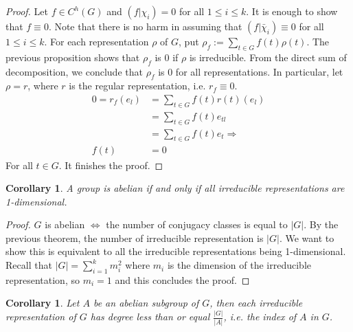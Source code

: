 \documentclass[letterpaper, leqno, 12pt]{article}
\providecommand{\abs}[1]{\left\lvert#1\right\rvert}
\theoremstyle{stdthm}
\newtheorem{cor}[thm]{Corollary}
\theoremstyle{stddef}
\theoremstyle{stdnonum}
\theoremstyle{stdqands}
\theoremstyle{stdbold}
\begin{document}
\begin{proof}
Let $f \in C^h(G)$ and $(f|\chi_i) = 0$ for all $1\leq i \leq k$. It is enough to show that $f \equiv 0$. Note that there is no harm in assuming that $(f|\bar{\chi}_i) \equiv 0$ for all $1\leq i\leq k$.  For each representation $\rho$ of $G$, put $\rho_f:= \sum_{t\in G} f(t)\rho(t)$. The previous proposition shows that $\rho_f$ is 0 if $\rho$ is irreducible. From the direct sum of decomposition, we conclude that $\rho_f$ is 0 for all representations. In particular, let $\rho = r$, where $r$ is the regular representation, i.e. $r_f \equiv 0$.  
\begin{align*}
0 = r_f(e_l) &= \sum_{t\in G} f(t)r(t)(e_l)\\
&= \sum_{t\in G} f(t)e_{tl}\\
&= \sum_{t \in G} f(t)e_t\Rightarrow \\
f(t) &= 0
\end{align*}
For all $t \in G$. It finishes the proof. 
\end{proof}

\begin{cor}
A group is abelian if and only if all irreducible representations are 1-dimensional. 
\end{cor}

\begin{proof}
$G$ is abelian $\Leftrightarrow$ the number of conjugacy classes is equal to $\abs{G}$. By the previous theorem, the number of irreducible representation is $\abs{G}$. We want to show this is equivalent to all the irreducible representations being 1-dimensional. Recall that $\abs{G} = \sum_{i=1}^k m_i^2$ where $m_i$ is the dimension of the irreducible representation, so $m_i = 1$ and this concludes the proof. 
\end{proof}

\begin{cor}
Let $A$ be an abelian subgroup of $G$, then each irreducible representation of $G$ has degree less than or equal $\frac{|G|}{|A|}$, i.e. the index of $A$ in $G$. 
\end{cor}
\end{document}
